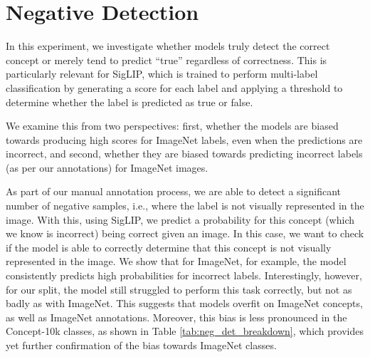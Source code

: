 \documentclass[11pt]{article}
\newcommand{\benchmark}{Concept-10k}
\begin{document}

\section{Negative Detection}
\label{sec:appendix-neg}
In this experiment, we investigate whether models truly detect the correct concept or merely tend to predict “true” regardless of correctness. 
This is particularly relevant for SigLIP, which is trained to perform multi-label classification by generating a score for each label and applying a threshold to determine whether the label is predicted as true or false.

We examine this from two perspectives: first, whether the models are biased towards producing high scores for ImageNet labels, even when the predictions are incorrect, and second, whether they are biased towards predicting incorrect labels (as per our annotations) for ImageNet images.

As part of our manual annotation process, we are able to detect a significant number of negative samples, i.e., where the label is not visually represented in the image.
With this, using SigLIP, we predict a probability for this concept (which we know is incorrect) being correct given an image. 
In this case, we want to check if the model is able to correctly determine that this concept is not visually represented in the image. 
We show that for ImageNet, for example, the model consistently predicts high probabilities for incorrect labels. 
Interestingly, however, for our split, the model still struggled to perform this task correctly, but not as badly as with ImageNet. This suggests that models overfit on ImageNet concepts, as well as ImageNet annotations. 
Moreover, this bias is less pronounced in the Concept-10k classes, as shown in Table \ref{tab:neg_det_breakdown}, which provides yet further confirmation of the bias towards ImageNet classes.
\end{document}
